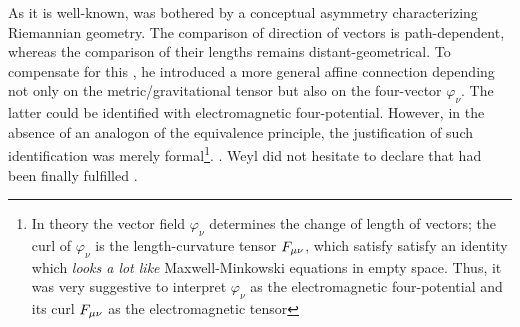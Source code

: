 \documentclass[final]{article}
\newcommand{\phin}{\ensuremath{\varphi_\nu}\xspace}
\renewcommand{\fmn}{\ensuremath{F\mn}\xspace}
\begin{document}
As it is well-known, \citet{Weyl1918b,Weyl1918a,Weyl1919a} was bothered by a conceptual asymmetry characterizing Riemannian geometry. The comparison of direction of vectors is path-dependent, whereas the comparison of their lengths remains distant-geometrical. To compensate for this  \citep{Afriat2009}, he introduced a more general affine connection depending not only on the metric/gravitational tensor \gmn but also on the four-vector \phin. The latter could be identified with electromagnetic four-potential. However, in the absence of an analogon of the equivalence principle, the justification of such identification was merely formal\footnote{In  theory the vector field \phin determines the change of length of vectors;  the curl of \phin is the length-curvature tensor \fmn, which satisfy satisfy an identity which \emph{looks a lot like} Maxwell-Minkowski equations in empty space. Thus, it was very suggestive to interpret \phin as the electromagnetic four-potential and its curl \fmn as the electromagnetic tensor}. . Weyl did not hesitate to declare that  had been finally fulfilled \citep[263]{Weyl1919}.
\end{document}
